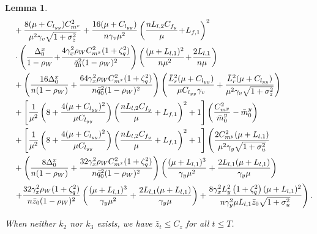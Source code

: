 \documentclass{article}
\theoremstyle{plain}
\newtheorem{lemma}[lemma]{Lemma}
\theoremstyle{definition}
\theoremstyle{remark}
\begin{document}
\begin{lemma}
\begin{align}
&\quad+ \frac{8(\mu + C_{l_{yy}})C_{m^v}^2}{\mu^2\gamma_v\sqrt{1+\sigma_z^2}} + \frac{16(\mu + C_{l_{yy}})}{n\gamma_v\mu^2}\left(\frac{nL_{l,2}C_{f_y}}{\mu}\!+\!L_{f,1}\right)^2 \notag \\
&\quad \cdot \left(\frac{\Delta_0^x}{1-\rho_W}\!+\!\frac{4 \gamma_x^2 \rho_WC_{m^x}^2 (1 + \zeta_q^2)}{\bar{q}_0^2(1 - \rho_W)^2} \right)\left(\frac{(\mu+L_{l,1})^2}{n\mu^2 }\!+\!\frac{2L_{l,1}}{n\mu }\right)\notag \\
&\quad+\left(\frac{16\Delta_0^x}{n(1-\rho_W)}+\frac{64\gamma_x^2\rho_WC_{m^x}^2(1+\zeta_q^2)}{n\bar{q}_0^2(1-\rho_W)^2}\right)\left(\frac{ \bar{L}_r^2(\mu + C_{l_{yy}})}{\mu C_{l_{yy}}\gamma_v}+\frac{\bar{L}_r^2(\mu+C_{l_{yy}})}{\mu^2\gamma_v\sqrt{1+\sigma_z^2}}\right) \notag \\
&\quad  +\left[ \frac{1}{\mu^2}\left(8+\frac{4(\mu + C_{l_{yy}})^2}{\mu C_{l_{yy}}} \right)\left(\frac{nL_{l,2}C_{f_y}}{\mu}+L_{f,1}\right)^2+1\right]\left(\frac{C_{m^y}^2}{\bar{m}^y_0} - {\bar{m}^y_0}\right)  \notag \\
&\quad  +\left[ \frac{1}{\mu^2}\left(8+\frac{4(\mu + C_{l_{yy}})^2}{\mu C_{l_{yy}}} \right)\left(\frac{nL_{l,2}C_{f_y}}{\mu}+L_{f,1}\right)^2+1\right]\left(\frac{ 2C_{m^y}^2(\mu + L_{l,1})}{\mu^2\gamma_y\sqrt{1+\sigma_u^2}} \right.\notag\\
&\quad+\left(\frac{8\Delta_0^x}{n(1-\rho_W)}+\frac{32 \gamma_x^2 \rho_WC_{m^x}^2 (1 + \zeta_q^2)}{n\bar{q}_0^2(1 - \rho_W)^2} \right)\left(\frac{(\mu+L_{l,1})^3}{\gamma_y\mu^2}+\frac{2L_{l,1}(\mu+L_{l,1})}{\gamma_y\mu}\right)\nonumber\\
&\quad\left.+ \frac{32 \gamma_x^2 \rho_W(1 + \zeta_q^2)}{n\bar{z}_0(1 - \rho_W)^2} \left(\frac{(\mu+L_{l,1})^3}{\gamma_y\mu^2}+\frac{2L_{l,1}(\mu+L_{l,1})}{\gamma_y\mu}\right)+\frac{8\gamma_x^2  L_y^2\left( 1 + \zeta_q^2 \right) (\mu + L_{l,1})^2}{n\gamma_y^2\mu L_{l,1}\bar{z}_0\sqrt{1+\sigma_u^2}} \right). \label{eq85}
\end{align}

When neither $k_2$ nor $k_3$ exists, we have $\bar{z}_t \leq C_z$ for all $t \leq T$.
\end{lemma}
\end{document}
